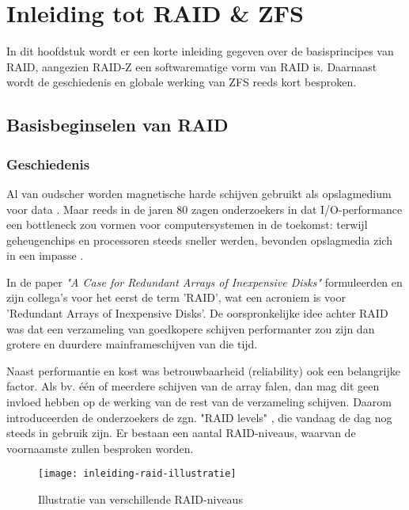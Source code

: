 

\chapter{Inleiding tot RAID \& ZFS}
\label{ch:h2}

In dit hoofdstuk wordt er een korte inleiding gegeven over de basisprincipes van RAID, aangezien RAID-Z een softwarematige vorm van RAID is. Daarnaast wordt de geschiedenis en globale werking van ZFS reeds kort besproken. 

\section{Basisbeginselen van RAID}

\subsection{Geschiedenis}

Al van oudscher worden magnetische harde schijven gebruikt als opslagmedium voor data \autocite{Goda2012}. Maar reeds in de jaren 80 zagen onderzoekers in dat I/O-performance een \gls{bottleneck} zou vormen voor computersystemen in de toekomst: terwijl geheugenchips en processoren steeds sneller werden, bevonden opslagmedia zich in een impasse \autocite{DavidA.Paterson1987}.

In de paper \textit{"A Case for Redundant Arrays of Inexpensive Disks"}  formuleerden \textcite{DavidA.Paterson1987} en zijn collega's voor het eerst de term 'RAID', wat een acroniem is voor 'Redundant Arrays of Inexpensive Disks'. De oorspronkelijke idee achter RAID was dat een verzameling van goedkopere schijven performanter zou zijn dan grotere en duurdere mainframeschijven van die tijd. 

Naast \gls{performantie} en kost was \gls{betrouwbaarheid} (reliability) ook een belangrijke factor. Als bv. één of meerdere schijven van de array falen, dan mag dit geen invloed hebben op de werking van de rest van de verzameling schijven. Daarom introduceerden de onderzoekers de zgn. "RAID levels"    \autocite{DavidA.Paterson1987}, die vandaag de dag nog steeds in gebruik zijn. Er bestaan een aantal RAID-niveaus, waarvan de voornaamste zullen besproken worden.

\begin{figure}
	\centering
	\texttt{[image: inleiding-raid-illustratie]}
	\caption{Illustratie van verschillende RAID-niveaus \autocite{Chen1994}}
	\label{fig:chen_array_illustratie}
\end{figure}

